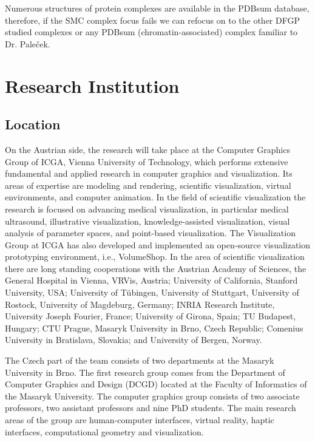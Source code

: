\documentclass[11pt,a4paper,titlepage,oneside,onecolumn]{article}
\begin{document}
Numerous structures of protein complexes are available in the PDBsum database, therefore, if the SMC complex focus fails we can refocus on to the other DFGP studied complexes or any PDBsum (chromatin-associated) complex familiar to Dr. Pale\v{c}ek. 
\section{Research Institution}
\label{sec:ResearchInstitution}

\subsection{Location}
\vspace{-4mm}
On the Austrian side, the research will take place at the Computer Graphics Group of ICGA, Vienna University of Technology, which performs extensive fundamental and applied research in computer graphics and visualization. 
Its areas of expertise are modeling and rendering, scientific visualization, virtual environments, and computer animation. In the field of scientific visualization the research is focused on advancing medical visualization, in particular medical ultrasound, illustrative visualization, knowledge-assisted visualization, visual analysis of parameter spaces, and point-based visualization. The Visualization Group at ICGA has also developed and implemented an open-source visualization prototyping environment, i.e., VolumeShop. In the area of scientific visualization there are long standing cooperations with the Austrian Academy of Sciences, the General Hospital in Vienna, VRVis, Austria; University of California, Stanford University, USA; University of T\"{u}bingen, University of Stuttgart, University of Rostock, University of Magdeburg, Germany; INRIA Research Institute, University Joseph Fourier, France;  University of Girona, Spain; TU Budapest, Hungary; CTU Prague, Masaryk University in Brno, Czech Republic; Comenius University in Bratislava, Slovakia; and University of Bergen, Norway.

The Czech part of the team consists of two departments at the Masaryk University in Brno.
The first research group comes from the Department of Computer Graphics and Design (DCGD) located at the Faculty of Informatics of the Masaryk University. 
The computer graphics group consists of two associate professors, two assistant professors and nine PhD students. 
The main research areas of the group are human-computer interfaces, virtual reality, haptic interfaces, computational geometry and visualization. 
\end{document}
